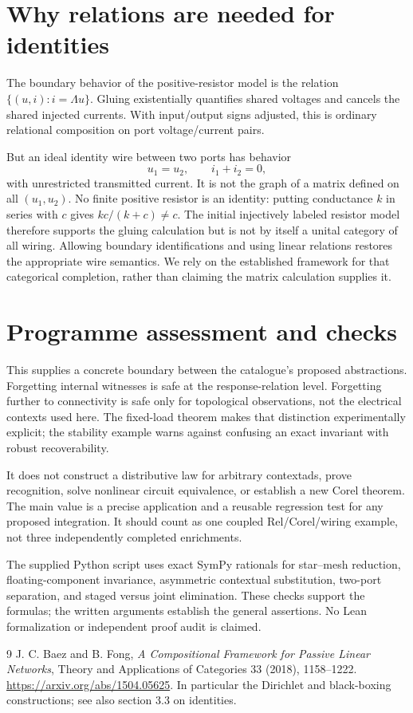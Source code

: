 \documentclass[11pt]{article}
\begin{document}
\section{Why relations are needed for identities}
The boundary behavior of the positive-resistor model is the relation $\{(u,i):i=\Lambda u\}$. Gluing existentially quantifies shared voltages and cancels the shared injected currents. With input/output signs adjusted, this is ordinary relational composition on port voltage/current pairs.

But an ideal identity wire between two ports has behavior
\[u_1=u_2,\qquad i_1+i_2=0,\]
with unrestricted transmitted current. It is not the graph of a matrix defined on all $(u_1,u_2)$. No finite positive resistor is an identity: putting conductance $k$ in series with $c$ gives $kc/(k+c)\ne c$. The initial injectively labeled resistor model therefore supports the gluing calculation but is not by itself a unital category of all wiring. Allowing boundary identifications and using linear relations restores the appropriate wire semantics. We rely on the established framework \cite{BF} for that categorical completion, rather than claiming the matrix calculation supplies it.

\section{Programme assessment and checks}
This supplies a concrete boundary between the catalogue's proposed abstractions. Forgetting internal witnesses is safe at the response-relation level. Forgetting further to connectivity is safe only for topological observations, not the electrical contexts used here. The fixed-load theorem makes that distinction experimentally explicit; the stability example warns against confusing an exact invariant with robust recoverability.

It does not construct a distributive law for arbitrary contextads, prove recognition, solve nonlinear circuit equivalence, or establish a new Corel theorem. The main value is a precise application and a reusable regression test for any proposed integration. It should count as one coupled Rel/Corel/wiring example, not three independently completed enrichments.

The supplied Python script uses exact SymPy rationals for star--mesh reduction, floating-component invariance, asymmetric contextual substitution, two-port separation, and staged versus joint elimination. These checks support the formulas; the written arguments establish the general assertions. No Lean formalization or independent proof audit is claimed.
\begin{thebibliography}{9}
 J. C. Baez and B. Fong, \emph{A Compositional Framework for Passive Linear Networks}, Theory and Applications of Categories 33 (2018), 1158--1222. \url{https://arxiv.org/abs/1504.05625}. In particular the Dirichlet and black-boxing constructions; see also section 3.3 on identities.
\end{thebibliography}
\end{document}
